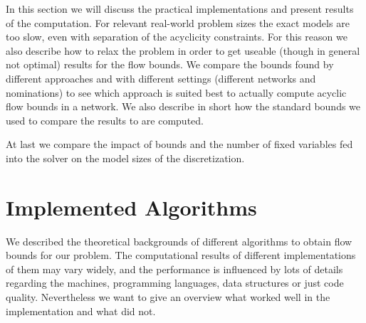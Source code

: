 \label{chapter:compresults}
In this section we will discuss the practical implementations and present results of the computation. For relevant 
real-world problem sizes the exact models are too slow, even with separation of the acyclicity constraints. For this 
reason we also describe how to relax the problem in order to get useable (though in general not optimal) results for the 
flow bounds. 
We compare the bounds found by different approaches and with different settings (different networks and nominations) 
to see which approach is suited best to actually compute acyclic flow bounds in a network. We also describe in short 
how the standard bounds we used to compare the results to are computed. 

At last we compare the impact of bounds and the number of fixed variables fed into the solver on the model sizes of the 
discretization. \\

\section{Implemented Algorithms}

We described the theoretical backgrounds of different algorithms to obtain flow bounds for our problem. The 
computational results of different implementations of them may vary widely, and the performance is influenced by lots 
of details regarding the machines, programming languages, data structures or just code quality. Nevertheless we want 
to give an overview what worked well in the implementation and what did not.\\


